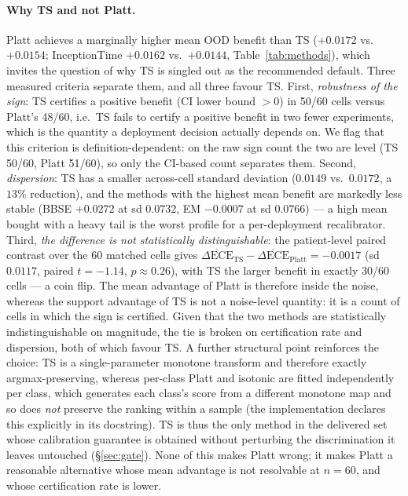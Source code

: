 \documentclass[review,12pt,nonatbib]{elsarticle}
\begin{document}
\paragraph{Why TS and not Platt.} Platt achieves a marginally higher
mean OOD benefit than TS ($+0.0172$ vs.\ $+0.0154$; InceptionTime
$+0.0162$ vs.\ $+0.0144$, Table~\ref{tab:methods}), which invites the
question of why TS is singled out as the recommended default. Three
measured criteria separate them, and all three favour TS. First,
\emph{robustness of the sign}: TS certifies a positive benefit (CI
lower bound $>0$) in 50/60 cells versus Platt's 48/60, i.e.\ TS fails
to certify a positive benefit in two fewer experiments, which is the
quantity a deployment decision actually depends on. We flag that this
criterion is definition-dependent: on the raw sign count the two are
level (TS 50/60, Platt 51/60), so only the CI-based count separates
them. Second, \emph{dispersion}: TS has a smaller across-cell
standard deviation ($0.0149$ vs.\ $0.0172$, a $13\%$ reduction), and the
methods with the highest mean benefit are markedly less stable
(BBSE $+0.0272$ at sd $0.0732$, EM $-0.0007$ at sd $0.0766$) ---
a high mean bought with a heavy tail is the worst profile for a
per-deployment recalibrator. Third, \emph{the difference is not
statistically distinguishable}: the patient-level paired contrast over
the 60 matched cells gives
$\overline{\Delta\text{ECE}}_{\text{TS}}-\overline{\Delta\text{ECE}}_{\text{Platt}}
= -0.0017$ (sd $0.0117$, paired $t=-1.14$, $p\approx0.26$), with TS the
larger benefit in exactly 30/60 cells --- a coin flip. The mean
advantage of Platt is therefore inside the noise, whereas the support
advantage of TS is not a noise-level quantity: it is a count of cells in
which the sign is certified. Given that the two methods are
statistically indistinguishable on magnitude, the tie is broken on
certification rate and dispersion, both of which favour TS. A further
structural point reinforces the choice: TS is a single-parameter
monotone transform and therefore exactly argmax-preserving, whereas
per-class Platt and isotonic are fitted independently per class, which
generates each class's score from a different monotone map and so does
\emph{not} preserve the ranking within a sample (the implementation
declares this explicitly in its docstring). TS is thus the only method
in the delivered set whose calibration guarantee is obtained without
perturbing the discrimination it leaves untouched
(\S\ref{sec:gate}). None of this makes Platt wrong; it makes Platt a
reasonable alternative whose mean advantage is not resolvable at
$n=60$, and whose certification rate is lower.
\end{document}
